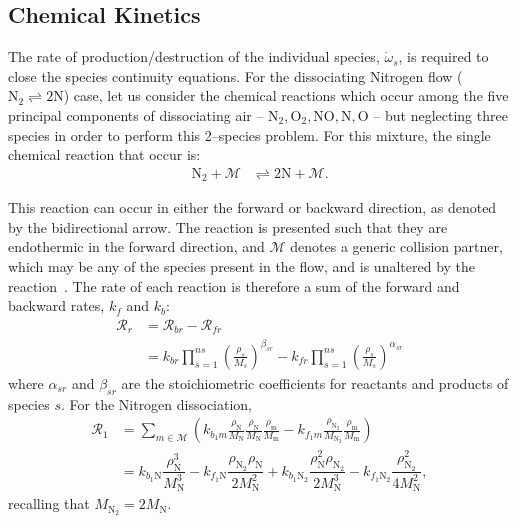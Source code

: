 \documentclass[10pt]{article}
\begin{document}
\subsection{Chemical Kinetics}
The rate of production/destruction of the individual species, $\dot{\omega}_s$, is required to close the species continuity equations. For the dissociating Nitrogen flow ($  \text{N}_2 \rightleftharpoons 2 \text{N}$) case, let us consider the chemical reactions which occur among the five principal components of dissociating air -- $\text{N}_2,\text{O}_2,\text{NO},\text{N},\text{O}$ -- but neglecting three species in order to perform this 2--species problem. For this mixture, the single chemical reaction that occur is:
\begin{align*}
 \text{N}_2 + \mathcal{M} &\rightleftharpoons 2\text{N} + \mathcal{M} .
\end{align*}

This reaction can occur in either the forward or backward direction, as denoted by the bidirectional arrow. The reaction is presented such that they are endothermic in the forward direction, and $\mathcal{M}$ denotes a generic collision partner, which may be any of the species present in the flow, and  is unaltered by the reaction~\citep{Kirk2009}.
The rate of each reaction is therefore a sum of the forward and backward rates,  $k_{f}$ and $k_{b}$:
\begin{equation*}
 \begin{split}
\mathcal{R}_r &=  \mathcal{R}_{br} - \mathcal{R}_{fr} \\
                &= k_{br} \prod_{s=1}^{ns} \left(\frac{\rho_s}{M_s}\right)^{\beta_{sr}} - k_{fr} \prod_{s=1}^{ns} \left(\frac{\rho_s}{M_s}\right)^{\alpha_{sr}}
 \end{split}
\end{equation*}
where $\alpha_{sr}$ and $\beta_{sr}$ are the stoichiometric coefficients for reactants and products of species $s$.
For the Nitrogen dissociation,
\begin{align}\label{eq:reaction1}
 \mathcal{R}_1 &= \sum_{m\in\mathcal{M}}\left(k_{b_1 m} \frac{\rho_{\text{N}}}{M_{\text{N}}}\frac{\rho_{\text{N}}}{M_{\text{N}}}\frac{\rho_{\text{m}}}{M_{\text{m}}} - k_{f_1 m}\frac{\rho_{\text{N}_2}}{M_{\text{N}_2}}\frac{\rho_{\text{m}}}{M_{\text{m}}} \right) \\
%
&= k_{b_1 \text{N}} \dfrac{\rho_{\text{N}}^3}{M_\text{N}^3} -
k_{f_1 \text{N}}   \dfrac{\rho_{\text{N}_2} \rho_{\text{N}}}{2  M_\text{N}^2}+
k_{b_1 \text{N}_2} \dfrac{\rho_\text{N}^2 \rho_{\text{N}_2}}{2M_\text{N}^3 }-
k_{f_1 \text{N}_2} \dfrac{\rho_{\text{N}_2}^2}{4 M_\text{N}^2},
\end{align}
recalling that $M_{\text{N}_2}=2 M_\text{N}.$
\end{document}
